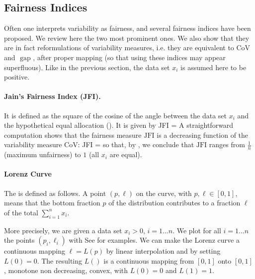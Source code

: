 \subsection{Fairness Indices}
Often one interprets variability as fairness, and several
fairness indices have been proposed. We review here the two
most prominent ones. We also show that they are in fact
reformulations of variability measures, i.e. they are
equivalent to $\mbox{CoV}$ and $\mbox{ gap }$, after proper
mapping (so that using these indices may appear superfluous).
Like in the previous section, the data set $x_i$ is assumed
here to be positive.

\paragraph{Jain's Fairness Index (JFI).}
It is
defined as the square of the cosine of the angle
between the data set $x_i$ and the hypothetical
equal allocation (). It is given by
 \be
 \mbox{JFI} =
\label{eq-jfi}
  \ee
A straightforward computation shows that the
fairness
 measure $\mbox{JFI}$ is a decreasing function of the
 variability measure $\mbox{CoV}$:
 \be
\mbox{JFI} = 
 \ee
 so that, by , we conclude that
 $\mbox{JFI}$ ranges from $\frac{1}{n}$ (maximum
 unfairness) to $1$ (all $x_i$ are equal).

 \begin{figure}
 \label{fig-jfi}
 \end{figure}

\paragraph{Lorenz Curve}
The  is defined as follows. A
point $(p,\ell)$ on the curve, with $p, \ell \in
[0,1]$, means that the bottom fraction $p$ of the
distribution contributes to a fraction $\ell$ of
the total $\sum_{i=1}^n x_i$.

More precisely, we are given a data set $x_i >0$,
$i=1...n$. We plot for all $i=1...n$ the points
$(p_i, \ell_i)$ with
 \be
 \ee
See  for examples. We can make
the Lorenz curve a continuous mapping $\ell=L(p)$
by linear interpolation and by setting $L(0)= 0$.
The resulting $L()$ is a continuous mapping from
$[0,1]$ onto $[0,1]$, monotone non decreasing,
convex, with $L(0)= 0$ and $L(1)=1$.

